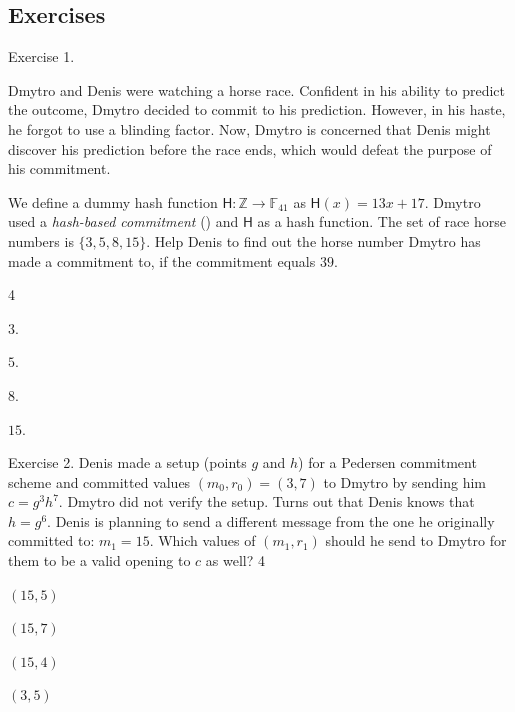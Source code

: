 \documentclass[../../book]{subfiles}
\begin{document}
\subsection{Exercises}

\vspace{-1mm}

\begin{xexercise}
    {Exercise 1.}
    {Dmytro and Denis were watching a horse race. Confident in
    his ability to predict the outcome, Dmytro decided to commit to his
    prediction. However, in his haste, he forgot to use a blinding factor. Now,
    Dmytro is concerned that Denis might discover his prediction before the race
    ends, which would defeat the purpose of his commitment.
    
    We define a dummy hash function $\mathsf{H}: \mathbb{Z} \to \mathbb{F}_{41}$ as $\mathsf{H}(x)
    = 13x+17$. Dmytro used a \textit{hash-based commitment} () and $\mathsf{H}$ as a hash
    function. The set of race horse numbers is $\{3, 5, 8, 15\}$. Help Denis to
    find out the horse number Dmytro has made a commitment to, if the
    commitment equals $39$.}
    {4}
    {
        \item $3$.
        \item $5$.
        \item $8$.
        \item $15$.
    }
\end{xexercise}

\begin{xexercise}
    {Exercise 2.}
    {Denis made a setup (points $g$ and $h$) for a Pedersen
    commitment scheme and committed values $(m_0, r_0) = (3, 7)$ to Dmytro by sending him
    $c = g^3h^7$. Dmytro did not verify the setup. Turns out that Denis knows
    that $h=g^6$. Denis is planning to send a different message from the one he
    originally committed to: $m_1 = 15$. Which values of $(m_1, r_1)$ should he send
    to Dmytro for them to be a valid opening to $c$ as well?}
    {4}
    {
        \item $(15, 5)$
        \item $(15, 7)$
        \item $(15, 4)$
        \item $(3, 5)$
    }
\end{xexercise}
\end{document}

